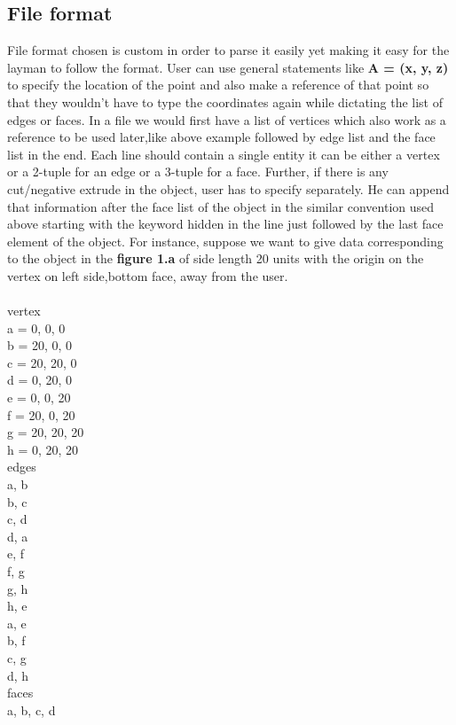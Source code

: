 \subsection{File format}
File format chosen is custom in order to parse it easily yet making it easy for the layman to follow the format. User can use general statements like \textbf{A = (x, y, z)} to specify the location of the point and also make a reference of that point so that they wouldn't have to type the coordinates again while dictating the list of edges or faces.
In a file we would first have a list of vertices which also work as a reference to be used later,like above example followed by edge list and the face list in the end.
Each line should contain a single entity it can be either a vertex or a 2-tuple for an edge or a 3-tuple for a face. Further, if there is any cut/negative extrude in the object, user has to specify separately. He can append that information after the face list of the object in the similar convention used above starting with the keyword hidden in the line just followed by the last face element of the object. For instance, suppose we want to give data corresponding to the object in the \textbf{figure 1.a} of side length 20 units with the origin on the vertex on left side,bottom face, away from the user. \\ \\
vertex\\
a = 0, 0, 0\\
b = 20, 0, 0\\
c = 20, 20, 0\\
d = 0, 20, 0\\
e = 0, 0, 20\\
f = 20, 0, 20\\
g = 20, 20, 20\\
h = 0, 20, 20\\
edges\\
a, b\\
b, c\\
c, d\\
d, a\\
e, f\\
f, g\\
g, h\\
h, e\\
a, e\\
b, f\\
c, g\\
d, h\\
faces\\
a, b, c, d\\
